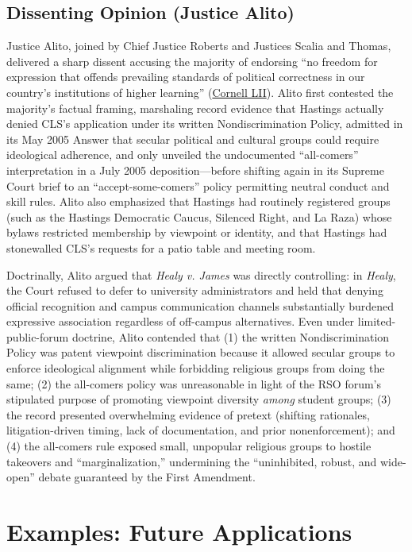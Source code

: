 \documentclass[12pt]{article}
\begin{document}
\subsection{Dissenting Opinion (Justice Alito)}

Justice Alito, joined by Chief Justice Roberts and Justices Scalia and Thomas, delivered a sharp dissent accusing the majority of endorsing ``no freedom for expression that offends prevailing standards of political correctness in our country's institutions of higher learning'' (\href{https://www.law.cornell.edu/supct/html/08-1371.ZD.html}{Cornell LII}). Alito first contested the majority's factual framing, marshaling record evidence that Hastings actually denied CLS's application under its written Nondiscrimination Policy, admitted in its May 2005 Answer that secular political and cultural groups could require ideological adherence, and only unveiled the undocumented ``all-comers'' interpretation in a July 2005 deposition---before shifting again in its Supreme Court brief to an ``accept-some-comers'' policy permitting neutral conduct and skill rules. Alito also emphasized that Hastings had routinely registered groups (such as the Hastings Democratic Caucus, Silenced Right, and La Raza) whose bylaws restricted membership by viewpoint or identity, and that Hastings had stonewalled CLS's requests for a patio table and meeting room.

Doctrinally, Alito argued that \textit{Healy v. James} was directly controlling: in \textit{Healy}, the Court refused to defer to university administrators and held that denying official recognition and campus communication channels substantially burdened expressive association regardless of off-campus alternatives. Even under limited-public-forum doctrine, Alito contended that (1) the written Nondiscrimination Policy was patent viewpoint discrimination because it allowed secular groups to enforce ideological alignment while forbidding religious groups from doing the same; (2) the all-comers policy was unreasonable in light of the RSO forum's stipulated purpose of promoting viewpoint diversity \textit{among} student groups; (3) the record presented overwhelming evidence of pretext (shifting rationales, litigation-driven timing, lack of documentation, and prior nonenforcement); and (4) the all-comers rule exposed small, unpopular religious groups to hostile takeovers and ``marginalization,'' undermining the ``uninhibited, robust, and wide-open'' debate guaranteed by the First Amendment.

\section{Examples: Future Applications}
\end{document}
